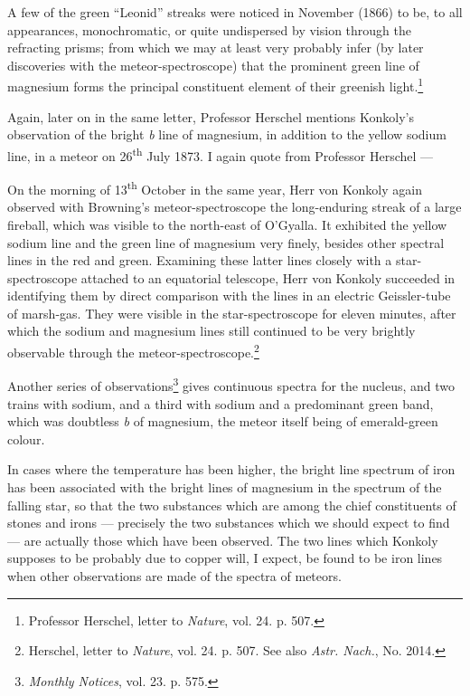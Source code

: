 \documentclass[a4paper, 12pt, oneside, polutonikogreek, english]{article}
\begin{document}
A few of the green ``Leonid'' streaks were noticed in November (1866) to be, to all appearances, monochromatic, or quite undispersed by vision through the refracting prisms; from which we may at least very probably infer (by later discoveries with the meteor-spectroscope) that the prominent green line of magnesium forms the principal constituent element of their greenish light.\footnote{Professor Herschel, letter to \emph{Nature}, vol. 24. p. 507.}

Again, later on in the same letter, Professor Herschel mentions Konkoly's observation of the bright \emph{b} line of magnesium, in addition to the yellow sodium line, in a meteor on 26\textsuperscript{th} July 1873. I again quote from Professor Herschel ---

On the morning of 13\textsuperscript{th} October in the same year, Herr von Konkoly again observed with Browning's meteor-spectroscope the long-enduring streak of a large fireball, which was visible to the north-east of O'Gyalla. It exhibited the yellow sodium line and the green line of magnesium very finely, besides other spectral lines in the red and green. Examining these latter lines closely with a star-spectroscope attached to an equatorial telescope, Herr von Konkoly succeeded in identifying them by direct comparison with the lines in an electric Geissler-tube of marsh-gas. They were visible in the star-spectroscope for eleven minutes, after which the sodium and magnesium lines still continued to be very brightly observable through the meteor-spectroscope.\footnote{Herschel, letter to \emph{Nature}, vol. 24. p. 507. See also \emph{Astr. Nach.}, No. 2014.}

Another series of observations\footnote{\emph{Monthly Notices}, vol. 23. p. 575.} gives continuous spectra for the nucleus, and two trains with sodium, and a third with sodium and a predominant green band, which was doubtless \emph{b} of magnesium, the meteor itself being of emerald-green colour.

In cases where the temperature has been higher, the bright line spectrum of iron has been associated with the bright lines of magnesium in the spectrum of the falling star, so that the two substances which are among the chief constituents of stones and irons --- precisely the two substances which we should expect to find --- are actually those which have been observed. The two lines which Konkoly supposes to be probably due to copper will, I expect, be found to be iron lines when other observations are made of the spectra of meteors.
\end{document}
